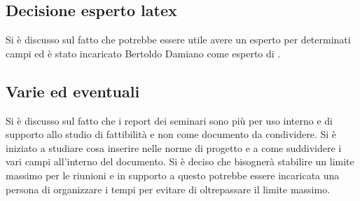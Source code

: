 \subsection*{Decisione esperto latex}
			Si è discusso sul fatto che potrebbe essere utile avere un esperto per determinati campi ed è stato incaricato Bertoldo Damiano come esperto di \glock{\LaTeX}.


\subsection*{Varie ed eventuali}
			Si è discusso sul fatto che i report dei seminari sono più per uso interno e di supporto allo studio di fattibilità e non come documento da condividere.
			Si è iniziato a studiare cosa inserire nelle norme di progetto e a come suddividere i vari campi all'interno del documento.
			Si è deciso che bisognerà stabilire un limite massimo per le riunioni e in supporto a questo potrebbe essere incaricata una persona di organizzare i tempi per evitare di oltrepassare il limite massimo.



